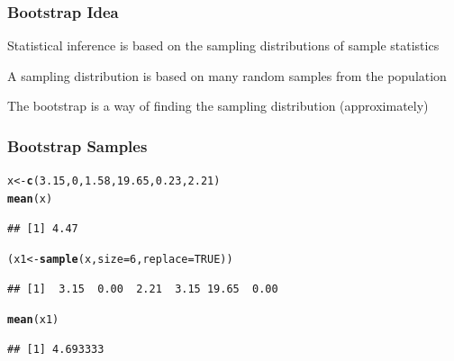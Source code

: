\documentclass[12pt]{beamer}\usepackage[]{graphicx}\usepackage[]{color}
\makeatletter
\newcommand{\hlnum}[1]{\textcolor[rgb]{0.686,0.059,0.569}{#1}}%
\newcommand{\hlstd}[1]{\textcolor[rgb]{0.345,0.345,0.345}{#1}}%
\newcommand{\hlkwb}[1]{\textcolor[rgb]{0.69,0.353,0.396}{#1}}%
\newcommand{\hlkwc}[1]{\textcolor[rgb]{0.333,0.667,0.333}{#1}}%
\newcommand{\hlkwd}[1]{\textcolor[rgb]{0.737,0.353,0.396}{\textbf{#1}}}%
\newenvironment{kframe}{%
 \def\at@end@of@kframe{}%
 \ifinner\ifhmode%
  \def\at@end@of@kframe{\end{minipage}}%
  \begin{minipage}{\columnwidth}%
 \fi\fi%
 \def\FrameCommand##1{\hskip\@totalleftmargin \hskip-\fboxsep
 \colorbox{shadecolor}{##1}\hskip-\fboxsep
     \hskip-\linewidth \hskip-\@totalleftmargin \hskip\columnwidth}%
 \MakeFramed {\advance\hsize-\width
   \@totalleftmargin\z@ \linewidth\hsize
   \@setminipage}}%
 {\par\unskip\endMakeFramed%
 \at@end@of@kframe}
\newenvironment{knitrout}{}{} %
\makeatother
\begin{document}
\begin{frame}
\frametitle{Bootstrap Idea}

\bi
  \item Statistical inference is based on the sampling distributions of sample statistics
  \item A sampling distribution is based on many random samples from the population
  \item The bootstrap is a way of finding the sampling distribution (approximately)
\ei

\end{frame}


\begin{frame}[fragile]
\frametitle{Bootstrap Samples}

\begin{knitrout}\footnotesize
{}\color{fgcolor}\begin{kframe}
\begin{alltt}
\hlstd{x} \hlkwb{<-} \hlkwd{c}\hlstd{(}\hlnum{3.15}\hlstd{,} \hlnum{0}\hlstd{,} \hlnum{1.58}\hlstd{,} \hlnum{19.65}\hlstd{,} \hlnum{0.23}\hlstd{,} \hlnum{2.21}\hlstd{)}
\hlkwd{mean}\hlstd{(x)}
\end{alltt}
\begin{verbatim}
## [1] 4.47
\end{verbatim}
\end{kframe}
\end{knitrout}

\pause
\begin{knitrout}\footnotesize
{}\color{fgcolor}\begin{kframe}
\begin{alltt}
\hlstd{(x1} \hlkwb{<-} \hlkwd{sample}\hlstd{(x,} \hlkwc{size} \hlstd{=} \hlnum{6}\hlstd{,} \hlkwc{replace} \hlstd{=} \hlnum{TRUE}\hlstd{))}
\end{alltt}
\begin{verbatim}
## [1]  3.15  0.00  2.21  3.15 19.65  0.00
\end{verbatim}
\begin{alltt}
\hlkwd{mean}\hlstd{(x1)}
\end{alltt}
\begin{verbatim}
## [1] 4.693333
\end{verbatim}
\end{kframe}
\end{knitrout}

\end{frame}
\end{document}

